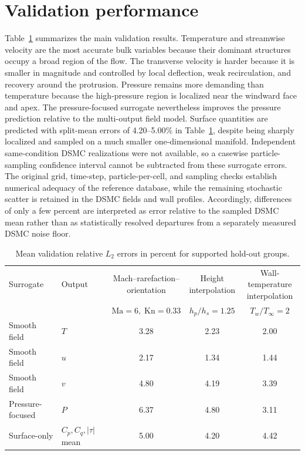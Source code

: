 \documentclass[aip,pof,preprint,notitlepage,floatfix,amsmath,amssymb]{revtex4-2}
\newcommand{\Kn}{\mathrm{Kn}}
\newcommand{\Ma}{\mathrm{Ma}}
\begin{document}
\section{Validation performance}
Table~\ref{tab:validation} summarizes the main validation results. Temperature and streamwise velocity are the most accurate bulk variables because their dominant structures occupy a broad region of the flow. The transverse velocity is harder because it is smaller in magnitude and controlled by local deflection, weak recirculation, and recovery around the protrusion. Pressure remains more demanding than temperature because the high-pressure region is localized near the windward face and apex. The pressure-focused surrogate nevertheless improves the pressure prediction relative to the multi-output field model. Surface quantities are predicted with split-mean errors of 4.20--5.00\% in Table~\ref{tab:validation}, despite being sharply localized and sampled on a much smaller one-dimensional manifold. Independent same-condition DSMC realizations were not available, so a casewise particle-sampling confidence interval cannot be subtracted from these surrogate errors. The original grid, time-step, particle-per-cell, and sampling checks establish numerical adequacy of the reference database, while the remaining stochastic scatter is retained in the DSMC fields and wall profiles. Accordingly, differences of only a few percent are interpreted as error relative to the sampled DSMC mean rather than as statistically resolved departures from a separately measured DSMC noise floor.

\begin{table}[t]
\centering
\caption{Mean validation relative $L_2$ errors in percent for supported hold-out groups.}
\label{tab:validation}
\footnotesize
\begin{tabular}{llccc}
\toprule
Surrogate & Output & \shortstack{Mach--rarefaction--\\orientation} & \shortstack{Height\\interpolation} & \shortstack{Wall-temperature\\interpolation} \\
 & & $\Ma=6,\;\Kn=0.33$ & $h_p/h_s=1.25$ & $T_w/T_\infty=2$ \\
\midrule
Smooth field & $T$ & 3.28 & 2.23 & 2.00 \\
Smooth field & $u$ & 2.17 & 1.34 & 1.44 \\
Smooth field & $v$ & 4.80 & 4.19 & 3.39 \\
Pressure-focused & $P$ & 6.37 & 4.80 & 3.11 \\
Surface-only & $C_p,C_q,|\tau|$ mean & 5.00 & 4.20 & 4.42 \\
\bottomrule
\end{tabular}
\end{table}
\end{document}
